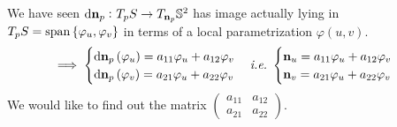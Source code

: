 We have seen \(\dd{\vb{n}}_p\colon T_p S\to T_{\vb{n}_p}\mathbb{S}^2\)
has image actually lying in \(T_p S=\operatorname{span}\left\{\varphi_u,
\varphi_v\right\}\) in terms of a local parametrization \(\varphi(u,v)\).
\[
    \implies \begin{cases}
        \dd\vb{n}_p\left(\varphi_u\right)=a_{11}\varphi_u+a_{12}\varphi_v\\
        \dd\vb{n}_p\left(\varphi_v\right)=a_{21}\varphi_u+a_{22}\varphi_v
    \end{cases}
    \text{{\itshape{}\/i.e.}\ }\begin{cases}
        \vb{n}_u=a_{11}\varphi_u+a_{12}\varphi_v\\
        \vb{n}_v=a_{21}\varphi_u+a_{22}\varphi_v
    \end{cases}
\]
We would like to find out the matrix \(\begin{pmatrix}
    a_{11}&a_{12}\\
    a_{21}&a_{22}
\end{pmatrix}\).

